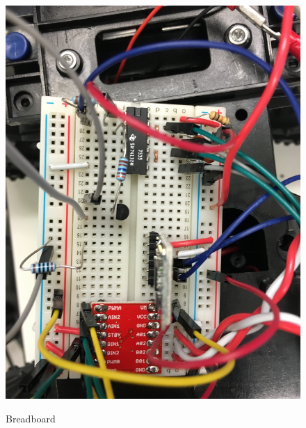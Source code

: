 \documentclass[12pt]{article}
\begin{document}
\begin{figure}[H]
\begin {center}
\includegraphics[scale=.10]{car-breadboard}\\
\caption{Breadboard}
\end {center}
\end{figure}
\end{document}
